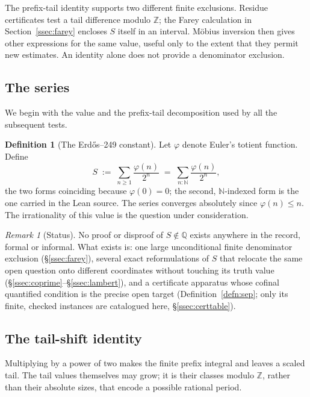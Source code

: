 \documentclass[11pt]{article}
\theoremstyle{plain}
\theoremstyle{definition}
\newtheorem{defn}[thm]{Definition}
\theoremstyle{remark}
\newtheorem{rem}[thm]{Remark}
\newcommand{\Z}{\mathbb{Z}}
\begin{document}
The prefix-tail identity supports two different finite exclusions.
Residue certificates test a tail difference modulo $\Z$; the Farey
calculation in Section~\ref{ssec:farey} encloses $S$ itself in an
interval. M\"obius inversion then gives other expressions for the
same value, useful only to the extent that they permit new estimates.
An identity alone does not provide a denominator exclusion.

\subsection{The series}

We begin with the value and the prefix-tail decomposition used by
all the subsequent tests.

\begin{defn}[The Erd\H{o}s--249 constant]
\label{defn:S}
Let $\varphi$ denote Euler's totient function. Define
\[
S \;:=\; \sum_{n \ge 1} \frac{\varphi(n)}{2^{n}} \;=\; \sum_{n : \mathbb{N}} \frac{\varphi(n)}{2^{n}},
\]
the two forms coinciding because $\varphi(0)=0$; the second, $\mathbb{N}$-indexed
form is the one carried in the Lean source. The series converges absolutely
since $\varphi(n)\le n$. The irrationality of this value is the question
under consideration.
\end{defn}

\begin{rem}[Status]
No proof or disproof of $S\notin\mathbb Q$ exists anywhere in the record,
formal or informal. What exists is: one large unconditional finite denominator
exclusion (\S\ref{ssec:farey}), several exact reformulations of $S$ that
relocate the same open question onto different coordinates without touching
its truth value (\S\ref{ssec:coprime}--\S\ref{ssec:lambert}), and a certificate
apparatus whose cofinal quantified condition is the precise open target
(Definition~\ref{defn:sep}; only its finite, checked instances
are catalogued here, \S\ref{ssec:certtable}).
\end{rem}

\subsection{The tail-shift identity}

Multiplying by a power of two makes the finite prefix integral and
leaves a scaled tail. The tail values themselves may grow; it is their
classes modulo $\Z$, rather than their absolute sizes, that encode a
possible rational period.
\end{document}
